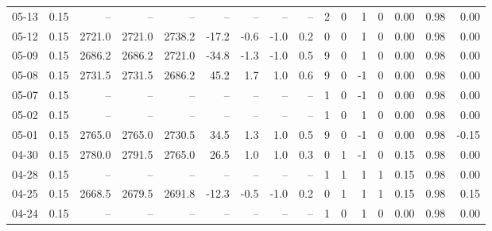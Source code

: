 \begin{threeparttable}
{\begin{tabular}{lrrrrrrrrrrrrrrr}
  05-13 &     0.15 &     -- &     -- &     -- &         -- &             -- &                       -- &                  -- &              2 &         0 &     1 &         0 &       0.00 &      0.98 &           0.00 \\
  05-12 &     0.15 & 2721.0 & 2721.0 & 2738.2 &      -17.2 &           -0.6 &                     -1.0 &                 0.2 &              0 &         0 &     1 &         0 &       0.00 &      0.98 &           0.00 \\
  05-09 &     0.15 & 2686.2 & 2686.2 & 2721.0 &      -34.8 &           -1.3 &                     -1.0 &                 0.5 &              9 &         0 &     1 &         0 &       0.00 &      0.98 &           0.00 \\
  05-08 &     0.15 & 2731.5 & 2731.5 & 2686.2 &       45.2 &            1.7 &                      1.0 &                 0.6 &              9 &         0 &    -1 &         0 &       0.00 &      0.98 &           0.00 \\
  05-07 &     0.15 &     -- &     -- &     -- &         -- &             -- &                       -- &                  -- &              1 &         0 &    -1 &         0 &       0.00 &      0.98 &           0.00 \\
  05-02 &     0.15 &     -- &     -- &     -- &         -- &             -- &                       -- &                  -- &              1 &         0 &     1 &         0 &       0.00 &      0.98 &           0.00 \\
  05-01 &     0.15 & 2765.0 & 2765.0 & 2730.5 &       34.5 &            1.3 &                      1.0 &                 0.5 &              9 &         0 &    -1 &         0 &       0.00 &      0.98 &          -0.15 \\
  04-30 &     0.15 & 2780.0 & 2791.5 & 2765.0 &       26.5 &            1.0 &                      1.0 &                 0.3 &              0 &         1 &    -1 &         0 &       0.15 &      0.98 &           0.00 \\
  04-28 &     0.15 &     -- &     -- &     -- &         -- &             -- &                       -- &                  -- &              1 &         1 &     1 &         1 &       0.15 &      0.98 &           0.00 \\
  04-25 &     0.15 & 2668.5 & 2679.5 & 2691.8 &      -12.3 &           -0.5 &                     -1.0 &                 0.2 &              0 &         1 &     1 &         1 &       0.15 &      0.98 &           0.15 \\
  04-24 &     0.15 &     -- &     -- &     -- &         -- &             -- &                       -- &                  -- &              1 &         0 &     1 &         0 &       0.00 &      0.98 &           0.00 \\

\end{tabular}}
\end{threeparttable}

